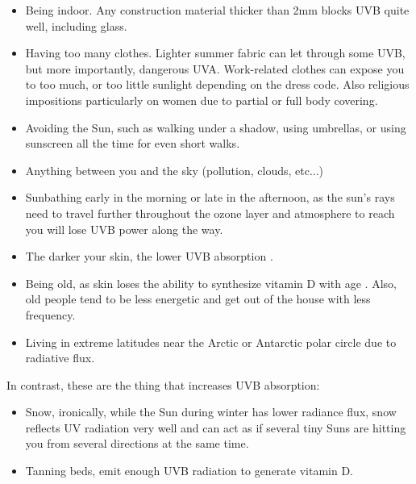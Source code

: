 \begin{itemize}
    
    \item Being indoor. Any construction material thicker than 2mm blocks UVB quite well, including glass.
    
    \item Having too many clothes. Lighter summer fabric can let through some UVB, but more importantly, dangerous UVA. Work-related clothes can expose you to too much, or too little sunlight depending on the dress code. Also religious impositions particularly on women due to partial or full body covering.
    
    \item Avoiding the Sun, such as walking under a shadow, using umbrellas, or using sunscreen all the time for even short walks.
    
    \item Anything between you and the sky (pollution, clouds, etc...)
    
    \item Sunbathing early in the morning or late in the afternoon, as the sun's rays need to travel further throughout the ozone layer and atmosphere to reach you will lose UVB power along the way.
    
    \item The darker your skin, the lower UVB absorption \cite{ref:1_Institute_of_Medicine2011-zg}.
    
    \item Being old, as skin loses the ability to synthesize vitamin D with age \cite{ref:Chalcraft2020}. Also, old people tend to be less energetic and get out of the house with less frequency.
    
    \item Living in extreme latitudes near the Arctic or Antarctic polar circle due to radiative flux.

\end{itemize}

In contrast, these are the thing that increases UVB absorption:

\begin{itemize}

    \item Snow, ironically, while the Sun during winter has lower radiance flux, snow reflects UV radiation very well and can act as if several tiny Suns are hitting you from several directions at the same time.
     
    \item Tanning beds, emit enough UVB radiation to generate vitamin D.
 
\end{itemize}
   
